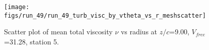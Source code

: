 \begin{figure}[H]
\centering
\texttt{[image: figs/run\_49/run\_49\_turb\_visc\_by\_vtheta\_vs\_r\_meshscatter]}
\caption{Scatter plot of mean total viscosity $\nu$ vs radius at $z/c$=9.00, $V_{free}$=31.28, station 5.}
\label{fig:run_49_turb_visc_by_vtheta_vs_r_meshscatter}
\end{figure}


